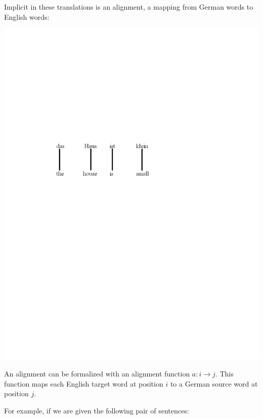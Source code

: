 \documentclass[10pt]{report}
\theoremstyle{plain}
\begin{document}
{Implicit in these translations is an alignment, a mapping from
German words to English words:

\includegraphics[viewport = 100 440 400 530,clip]{constantin-figure1.pdf}

An alignment can be formalized with an alignment function $a : i
\rightarrow j$. This function maps each English target word at
position $i$ to a German source word at position $j$.

For example, if we are given the following pair of sentences:

}
\end{document}
